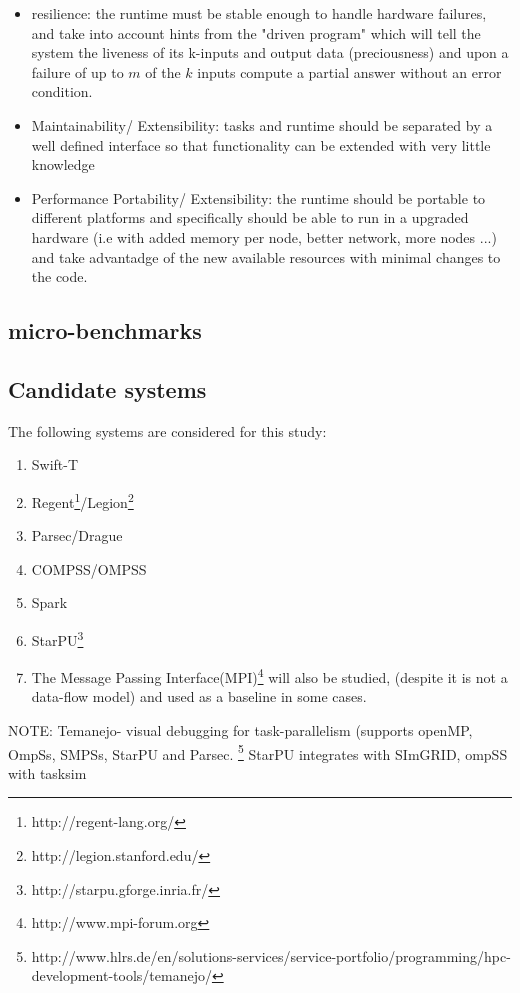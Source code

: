 \begin{itemize}
\item resilience: the runtime must be stable enough to handle hardware failures, and take into account hints from the "driven program" which will tell the system the liveness of its k-inputs and output data (preciousness) and upon a failure of up to $m$ of the $k$ inputs compute a partial answer without an error condition.
\item Maintainability/ Extensibility: tasks and runtime should be separated by a well defined interface so that functionality can be extended with very little knowledge 
\item Performance Portability/ Extensibility: the runtime should be portable to different platforms and specifically should be able to run in a upgraded hardware (i.e with added memory per node, better network, more nodes ...) and take advantadge of the new available resources with minimal changes to the code.
\end{itemize}

\subsection{micro-benchmarks}

\subsection{Candidate systems}
The following systems are considered for this study:
\begin{enumerate}
\item Swift-T 
\item Regent\footnote{http://regent-lang.org/}/Legion\footnote{http://legion.stanford.edu/}
\item Parsec/Drague
\item COMPSS/OMPSS
\item Spark
\item StarPU\footnote{http://starpu.gforge.inria.fr/}
\item The Message Passing Interface(MPI)\footnote{http://www.mpi-forum.org} will also be studied,
(despite it is not a data-flow model) and used as a baseline in some cases.
\end{enumerate}


NOTE: Temanejo- visual debugging for task-parallelism (supports openMP, OmpSs, SMPSs, StarPU and Parsec. \footnote{http://www.hlrs.de/en/solutions-services/service-portfolio/programming/hpc-development-tools/temanejo/}
StarPU integrates with SImGRID, ompSS with tasksim



